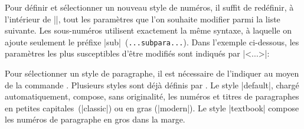 Pour définir et sélectionner un nouveau style de numéros, il suffit de redéfinir, à l'intérieur de |\makeparastyle|, tout les paramètres que l'on souhaite modifier parmi la liste suivante. Les sous-numéros utilisent exactement la même syntaxe, à laquelle on ajoute seulement le préfixe |sub|~(\texttt{...subpara...}). Dans l'exemple ci-dessous, les paramètres les plus susceptibles d'être modifiés sont indiqués par |<...>|:

\begin{macro}
\end{macro}

\begin{noprint}
\renewcommand{\thepara}{\arabic{para}}
\newcommand{\paraskip}{\relax}
\newcommand{\parasep}{.\enskip}
\newcommand{\paranumsep}{.~}
\newcommand{\paracolour}{\if@colourall\maincolour\fi}
\newcommand{\paranumcolour}{\paracolour}
\newcommand{\paratitlestyle}[1]{\bfseries#1}
\newcommand{\paranumstyle}[1]{\bfseries#1}

\renewcommand{\thesubpara}{\alph{subpara}}
\newcommand{\subparaskip}{\relax}
\newcommand{\subparasep}{.\enskip}
\newcommand{\subparanumsep}{).~}
\newcommand{\subparanumdash}{.}
\newcommand{\subparacolour}{}
\newcommand{\subparanumcolour}{\if@colourall\maincolour\fi}
\newcommand{\subparatitlestyle}[1]{\itshape#1}
\newcommand{\subparanumstyle}[1]{\bfseries\itshape#1}
\end{noprint}

Pour sélectionner un style de paragraphe, il est nécessaire de l'indiquer au moyen de la commande . Plusieurs styles sont déjà définis par \frenchlaw. Le style |default|, chargé automatiquement, compose, sans originalité, les numéros et titres de paragraphes en petites capitales~(|classic|) ou en gras (|modern|). Le style |textbook| compose les numéros de paragraphe en gros dans la marge.

